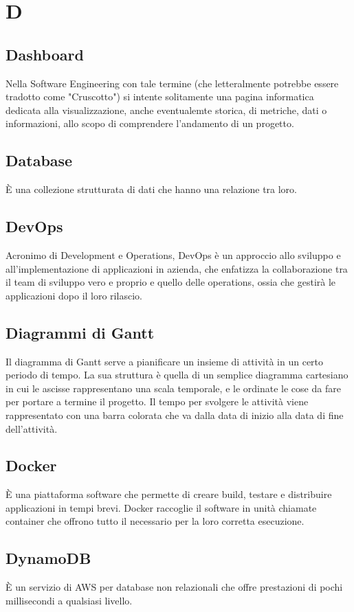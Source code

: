 \section*{D}

\subsection{Dashboard}
Nella Software Engineering con tale termine (che letteralmente potrebbe essere tradotto come "Cruscotto") si intente solitamente una pagina  informatica dedicata alla visualizzazione, anche eventualemte storica, di metriche, dati o informazioni, allo scopo di comprendere l'andamento di un progetto.

\subsection{Database}
È una collezione strutturata di dati che hanno una relazione tra loro.

\subsection{DevOps}
Acronimo di Development e Operations, DevOps è un approccio allo sviluppo e all’implementazione di applicazioni in azienda, che enfatizza la collaborazione tra il team di sviluppo vero e proprio e quello delle operations, ossia che gestirà le applicazioni dopo il loro rilascio.

\subsection{Diagrammi di Gantt}
Il diagramma di Gantt serve a pianificare un insieme di attività in un certo periodo di tempo. La sua struttura è quella di un semplice diagramma cartesiano in cui le ascisse rappresentano una scala temporale, e le ordinate le cose da fare per portare a termine il progetto. Il tempo per svolgere le attività viene rappresentato con una barra colorata che va dalla data di inizio alla data di fine dell'attività.

\subsection{Docker}
È una piattaforma software che permette di creare build, testare e distribuire applicazioni in tempi brevi. Docker raccoglie il software in unità chiamate container che offrono tutto il necessario per la loro corretta esecuzione.

\subsection{DynamoDB}
È un servizio di AWS per database non relazionali che offre prestazioni di pochi millisecondi a qualsiasi livello.

